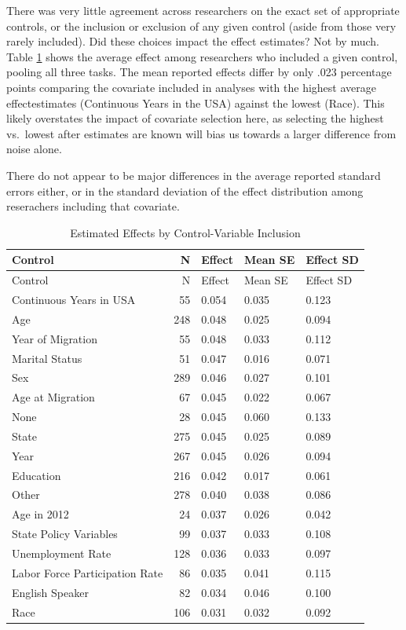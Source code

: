 \documentclass[
  letterpaper,
  DIV=11,
  numbers=noendperiod]{scrartcl}
\begin{document}
There was very little agreement across researchers on the exact set of
appropriate controls, or the inclusion or exclusion of any given control
(aside from those very rarely included). Did these choices impact the
effect estimates? Not by much. Table \ref{tab-effects-by-controls} shows
the average effect among researchers who included a given control,
pooling all three tasks. The mean reported effects differ by only .023
percentage points comparing the covariate included in analyses with the
highest average effectestimates (Continuous Years in the USA) against
the lowest (Race). This likely overstates the impact of covariate
selection here, as selecting the highest vs.~lowest after estimates are
known will bias us towards a larger difference from noise alone.

There do not appear to be major differences in the average reported
standard errors either, or in the standard deviation of the effect
distribution among reserachers including that covariate.

\begin{longtable}[]{@{}lrlll@{}}
\caption{Estimated Effects by Control-Variable Inclusion
\label{tab-effects-by-controls}}\tabularnewline
\toprule\noalign{}
Control & N & Effect & Mean SE & Effect SD \\
\midrule\noalign{}
\endfirsthead
\toprule\noalign{}
Control & N & Effect & Mean SE & Effect SD \\
\midrule\noalign{}
\endhead
\bottomrule\noalign{}
\endlastfoot
Continuous Years in USA & 55 & 0.054 & 0.035 & 0.123 \\
Age & 248 & 0.048 & 0.025 & 0.094 \\
Year of Migration & 55 & 0.048 & 0.033 & 0.112 \\
Marital Status & 51 & 0.047 & 0.016 & 0.071 \\
Sex & 289 & 0.046 & 0.027 & 0.101 \\
Age at Migration & 67 & 0.045 & 0.022 & 0.067 \\
None & 28 & 0.045 & 0.060 & 0.133 \\
State & 275 & 0.045 & 0.025 & 0.089 \\
Year & 267 & 0.045 & 0.026 & 0.094 \\
Education & 216 & 0.042 & 0.017 & 0.061 \\
Other & 278 & 0.040 & 0.038 & 0.086 \\
Age in 2012 & 24 & 0.037 & 0.026 & 0.042 \\
State Policy Variables & 99 & 0.037 & 0.033 & 0.108 \\
Unemployment Rate & 128 & 0.036 & 0.033 & 0.097 \\
Labor Force Participation Rate & 86 & 0.035 & 0.041 & 0.115 \\
English Speaker & 82 & 0.034 & 0.046 & 0.100 \\
Race & 106 & 0.031 & 0.032 & 0.092 \\
\end{longtable}
\end{document}

